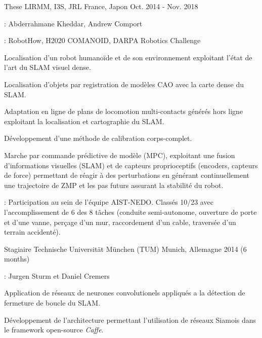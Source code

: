 \begin{cventries}
  \cventry
    {These} %
    {LIRMM, I3S, JRL} %
    {France, Japon} %
    {Oct. 2014 - Nov. 2018} %
    {
      \begin{cvitems} %
        \item {}: Abderrahmane Kheddar, Andrew Comport 
        \item {}: RobotHow, H2020 COMANOID, DARPA Robotics Challenge
        \item Localisation d'un robot humanoïde et de son environnement exploitant l'état de l'art du SLAM visuel dense.
        \item Localisation d'objets par registration de modèles CAO avec la carte dense du SLAM.
        \item Adaptation en ligne de plans de locomotion multi-contacts générés hors ligne exploitant la localisation et cartographie du SLAM.
        \item Développement d'une méthode de calibration corps-complet. 
        \item Marche par commande prédictive de modèle (MPC), exploitant une fusion d'informations visuelles (SLAM) et de capteurs proprioceptifs (encoders, capteurs de force) permettant de réagir à des perturbations en générant continuellement une trajectoire de ZMP et les pas futurs assurant la stabilité du robot.
        \item {}: Participation au sein de l'équipe AIST-NEDO. Classés 10/23 avec l'accomplissement de 6 des 8 tâches (conduite semi-autonome, ouverture de porte et d'une vanne, perçage d'un mur, raccordement d'un cable, traversée d'un terrain accidenté).
      \end{cvitems}
    }

  \cventry
    {Stagiaire} %
    {Technische Universität München (TUM)} %
    {Munich, Allemagne} %
    {2014 (6 months)} %
    {
      \begin{cvitems} %
        \item {}: Jurgen Sturm et Daniel Cremers
        \item Application de réseaux de neurones convolutionels appliqués a la détection de fermeture de boucle du SLAM.
        \item Développement de l'architecture permettant l'utilisation de réseaux Siamois dans le framework open-source \emph{Caffe}.
      \end{cvitems}
    }


\end{cventries}
